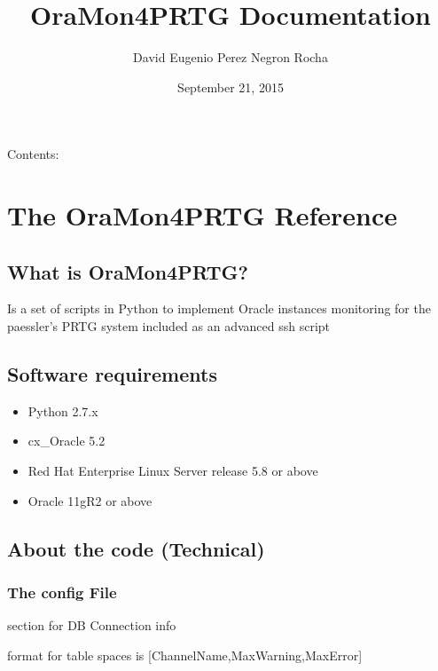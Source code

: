 \documentclass[letterpaper,10pt,english]{sphinxmanual}
\title{OraMon4PRTG Documentation}
\date{September 21, 2015}
\author{David Eugenio Perez Negron Rocha}
\begin{document}
\maketitle
\tableofcontents
{}\label{index::doc}


Contents:


\chapter{The OraMon4PRTG Reference}
\label{api:the-oramon4prtg-reference}\label{api::doc}\label{api:welcome-to-oramon4prtg-s-documentation}

\section{What is OraMon4PRTG?}
\label{api:what-is-oramon4prtg}
Is a set of scripts in Python to implement Oracle instances monitoring for the
paessler’s PRTG system included as an advanced ssh script


\section{Software requirements}
\label{api:software-requirements}\begin{itemize}
\item {} 
Python 2.7.x

\item {} 
cx\_Oracle 5.2

\item {} 
Red Hat Enterprise Linux Server release 5.8 or above

\item {} 
Oracle 11gR2 or above

\end{itemize}


\section{About the code (Technical)}
\label{api:about-the-code-technical}

\subsection{The config File}
\label{api:the-config-file}\label{api:module-config}
section for DB Connection info

\begin{fulllineitems}
\label{api:config.DbData}
format for table spaces is {[}ChannelName,MaxWarning,MaxError{]}

\end{fulllineitems}
\end{document}
